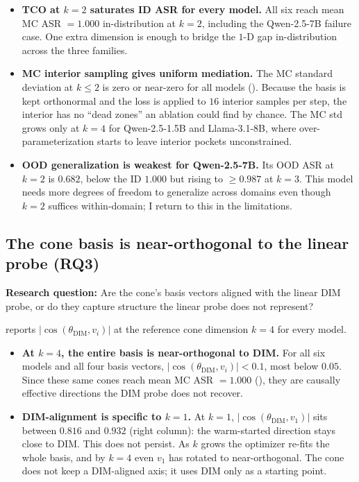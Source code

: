 \documentclass[sn-basic]{sn-jnl}
\newcommand{\dimv}{\theta_{\text{DIM}}}
\begin{document}
\begin{itemize}[leftmargin=*,nosep]
\item \textbf{TCO at $k{=}2$ saturates ID ASR for every model.} All six reach
mean MC ASR $= 1.000$ in-distribution at $k = 2$, including the Qwen-2.5-7B
failure case. One extra dimension is enough to bridge the $1$-D gap
in-distribution across the three families.

\item \textbf{MC interior sampling gives uniform mediation.} The MC standard
deviation at $k \le 2$ is zero or near-zero for all models
(). Because the basis is kept orthonormal and the loss is
applied to $16$ interior samples per step, the interior has no ``dead zones'' an
ablation could find by chance. The MC std grows only at $k=4$ for Qwen-2.5-1.5B
and Llama-3.1-8B, where over-parameterization starts to leave interior pockets
unconstrained.

\item \textbf{OOD generalization is weakest for Qwen-2.5-7B.} Its OOD ASR at
$k=2$ is $0.682$, below the ID $1.000$ but rising to $\ge 0.987$ at $k=3$. This
model needs more degrees of freedom to generalize across domains even though
$k=2$ suffices within-domain; I return to this in the limitations.
\end{itemize}



\subsection{The cone basis is near-orthogonal to the linear probe (RQ3)}
\label{sec:exp_orth}

\textbf{Research question:} Are the cone's basis vectors aligned with the linear
DIM probe, or do they capture structure the linear probe does not represent?

 reports $|\cos(\dimv, v_i)|$ at the reference cone
dimension $k = 4$ for every model.

\begin{itemize}[leftmargin=*,nosep]
\item \textbf{At $k=4$, the entire basis is near-orthogonal to DIM.} For all six
models and all four basis vectors, $|\cos(\dimv, v_i)| < 0.1$, most below $0.05$.
Since these same cones reach mean MC ASR $= 1.000$ (), they
are causally effective directions the DIM probe does not recover.

\item \textbf{DIM-alignment is specific to $k=1$.} At $k=1$, $|\cos(\dimv, v_1)|$
sits between $0.816$ and $0.932$ (right column): the warm-started direction stays
close to DIM. This does not persist. As $k$ grows the optimizer re-fits the whole
basis, and by $k=4$ even $v_1$ has rotated to near-orthogonal. The cone does not
keep a DIM-aligned axis; it uses DIM only as a starting point.

\end{itemize}
\end{document}
